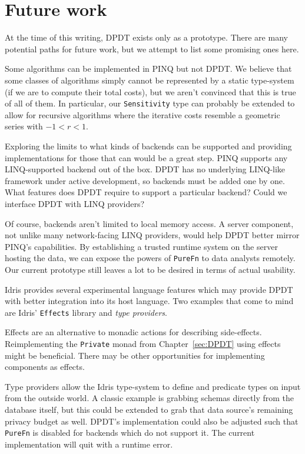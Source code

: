 \documentclass[12pt]{report}
\begin{document}
\section{Future work}\label{sec:future_work}

At the time of this writing, DPDT exists only as a prototype.
There are many potential paths for future work, but we attempt to list some promising ones here.

Some algorithms can be implemented in PINQ but not DPDT.
We believe that some classes of algorithms simply cannot be represented by a static type-system (if we are to compute their total costs), but we aren't convinced that this is true of all of them.
In particular, our \texttt{Sensitivity} type can probably be extended to allow for recursive algorithms where the iterative costs resemble a geometric series with $-1 < r < 1$.

Exploring the limits to what kinds of backends can be supported and providing implementations for those that can would be a great step.
PINQ supports any LINQ-supported backend out of the box.
DPDT has no underlying LINQ-like framework under active development, so backends must be added one by one.
What features does DPDT require to support a particular backend?
Could we interface DPDT with LINQ providers?

Of course, backends aren't limited to local memory access.
A server component, not unlike many network-facing LINQ providers, would help DPDT better mirror PINQ's capabilities.
By establishing a trusted runtime system on the server hosting the data, we can expose the powers of \texttt{PureFn} to data analysts remotely.
Our current prototype still leaves a lot to be desired in terms of actual usability.


Idris provides several experimental language features which may provide DPDT with better integration into its host language.
Two examples that come to mind are Idris' \texttt{Effects} library and \textit{type providers}.

Effects are an alternative to monadic actions for describing side-effects.
Reimplementing the \texttt{Private} monad from Chapter~\ref{sec:DPDT} using effects might be beneficial.
There may be other opportunities for implementing components as effects.

Type providers allow the Idris type-system to define and predicate types on input from the outside world.
A classic example is grabbing schemas directly from the database itself, but this could be extended to grab that data source's remaining privacy budget as well.
DPDT's implementation could also be adjusted such that \texttt{PureFn} is disabled for backends which do not support it.
The current implementation will quit with a runtime error.
\end{document}
